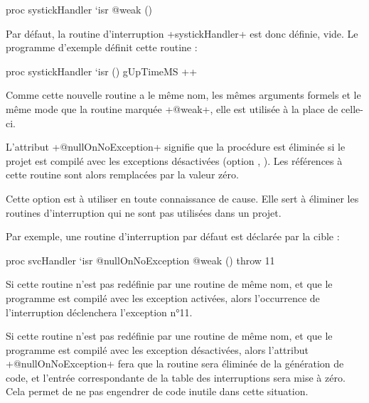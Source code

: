 \begin{PLM}
proc systickHandler `isr @weak () {
}
\end{PLM}

Par défaut, la routine d'interruption \plm+systickHandler+ est donc définie, vide. Le programme d'exemple définit cette routine :

\begin{PLM}
proc systickHandler `isr () {
  gUpTimeMS ++
}
\end{PLM}

Comme cette nouvelle routine a le même nom, les mêmes arguments formels et le même mode que la routine marquée \plm+@weak+, elle est utilisée à la place de celle-ci.







L'attribut \plm+@nullOnNoException+ signifie que la procédure est éliminée si le projet est compilé avec les exceptions désactivées (option , ). Les références à cette routine sont alors remplacées par la valeur zéro.

Cette option est à utiliser en toute connaissance de cause. Elle sert à éliminer les routines d'interruption qui ne sont pas utilisées dans un projet.

Par exemple, une routine d'interruption par défaut est déclarée par la cible :

\begin{PLM}
proc svcHandler `isr @nullOnNoException @weak () {
  throw 11
}
\end{PLM}

Si cette routine n'est pas redéfinie par une routine de même nom, et que le programme est compilé avec les exception activées, alors l'occurrence de l'interruption déclenchera l'exception n°11.

Si cette routine n'est pas redéfinie par une routine de même nom, et que le programme est compilé avec les exception désactivées, alors l'attribut \plm+@nullOnNoException+ fera que la routine sera éliminée de la génération de code, et l'entrée correspondante de la table des interruptions sera mise à zéro. Cela permet de ne pas engendrer de code inutile dans cette situation.

 





